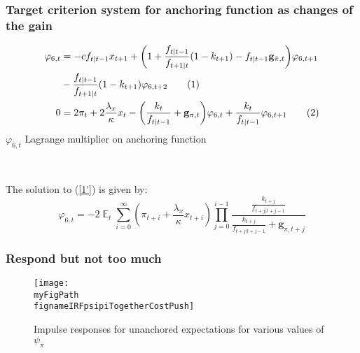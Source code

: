 \documentclass[10pt]{beamer}
\def \myFigPath {../../../figures/}
\newcommand\numberthis{\addtocounter{equation}{1}\tag{\theequation}} %
\DeclareMathOperator{\E}{\mathbb{E}}
\def\fignameIRFpsipiSmall{RIR_unanch_psi_pi1_01_command_IRFs_approx_pretty_2020_10_15}
\def\fignameIRFpsipiMedium{RIR_unanch_psi_pi1_5_command_IRFs_approx_pretty_2020_10_15}
\def\fignameIRFpsipiBig{RIR_unanch_psi_pi2_command_IRFs_approx_pretty_2020_10_15}
\def\fignameIRFpsipiTogetherCostPush{RIR_together_psi_pi2_command_IRFs_approx_pretty_together_2020_10_25}
\begin{document}
\begin{frame}[plain]  %
	\frametitle{Target criterion system for anchoring function as changes of the gain}
	\label{generalTC}

\begin{align*}
\varphi_{6,t} & = -c f_{t|t-1} x_{t+1} + \bigg(1+ \frac{f_{t|t-1}}{f_{t+1|t}}(1-k_{t+1}) -f_{t|t-1} \mathbf{g}_{\bar{\pi},t} \bigg) \varphi_{6,t+1} \\
& -\frac{f_{t|t-1}}{f_{t+1|t}}(1-k_{t+1})\varphi_{6,t+2} \numberthis \label{6'} \\
0 & = 2\pi_t + 2\frac{\lambda_x}{\kappa}x_t   - \bigg( \frac{k_t}{f_{t|t-1}} + \mathbf{g}_{\pi,t}\bigg)\varphi_{6,t} + \frac{k_t}{f_{t|t-1}}\varphi_{6,t+1}\numberthis \label{1'}
\end{align*}
$\varphi_{6,t}$ Lagrange multiplier on anchoring function

\

The solution to (\ref{1'}) is given by:
\begin{equation}
\varphi_{6,t} = -2\E_t\sum_{i=0}^{\infty}(\pi_{t+i}+\frac{\lambda_x}{\kappa}x_{t+i})\prod_{j=0}^{i-1}\frac{\frac{k_{t+j}}{f_{t+j|t+j-1}}}{\frac{k_{t+j}}{f_{t+j|t+j-1}} + \mathbf{g}_{\pi, t+j}} \label{sol1'}
\end{equation}


\vspace{-0.5cm}
 
\hyperlink{anchTC}{}	


\end{frame}

\begin{frame}[plain]  %
	\frametitle{Respond but not too much}\label{IRFs_function_psipi}

\begin{figure}[h!]
\texttt{[image: \\myFigPath \\fignameIRFpsipiTogetherCostPush]}
\caption{Impulse responses for unanchored expectations for various values of $\psi_{\pi}$}
\label{IRF_unanchored_psi}
\end{figure}

\vfill
\hyperlink{less_aggressive}{}	


\end{frame}
\end{document}
